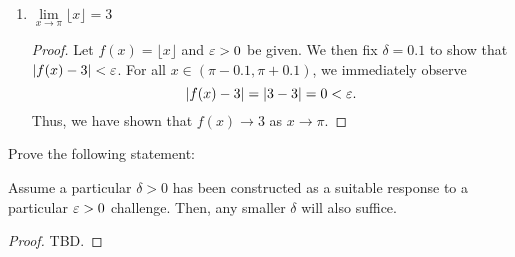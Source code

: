 \begin{problem}
\begin{enumerate}[label=(\alph*)]
\begin{proof}
\begin{itemize}
              The last inequality holds because $x^{2} + 2x + 4 \le 19$ for all
              $x$ such that $\abs{x - 2} < \delta \leq 1$,

            \item When $\eps > 19$, then $\delta = 1$. Then, for all $x$
              such that $\abs{x - 2} < 1$, it follows that
              \begin{align*}
                \abs{f(x) - 8} &= \\
                \abs{(x-2)(x^{2} +2x + 4)} &= \\
                \abs{x-2} \abs{x^{2} + 2x + 4} &< \abs{x^{2} + 2x + 4} \\ 
                                               &\leq 19 \\ 
                                               &< \eps
              \end{align*}
              because for all $x \in (1, 3)$, the expression $x^{2} + 2x + 4$ is bounded above by $19$.

        \end{itemize}
        Thus, we have shown that $f(x) \to 8$ as $x \to 2$. 
      \end{proof}

    \item $\lim\limits_{x \to \pi} \lfloor x \rfloor = 3$ 
      \begin{proof}
        Let $f(x) = \lfloor x \rfloor$ and $\varepsilon > 0$ be given. We then fix $\delta = 0.1$ to show
        that $\left\lvert f(x) - 3 \right\rvert < \varepsilon$. For all $x \in (\pi - 0.1, \pi + 0.1)$, we immediately observe
        \[
          \left\lvert f(x) - 3 \right\rvert = \left\lvert 3 - 3 \right\rvert = 0 < \varepsilon.
        \]
        Thus, we have shown that $f(x) \to 3$ as $x \to \pi$.
      \end{proof}

  \end{enumerate}
\end{problem}


\begin{problem}
  Prove the following statement:
    \begin{displayquote}
      Assume a particular $\delta > 0$ has been constructed as a suitable response to
      a particular $\varepsilon > 0$ challenge. Then, any smaller $\delta$ will also suffice.
    \end{displayquote}

  \begin{proof}
    TBD.
  \end{proof}
\end{problem}
